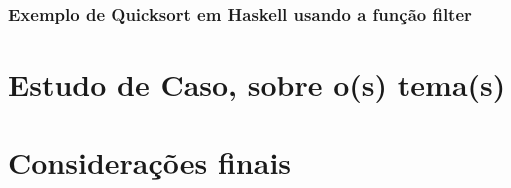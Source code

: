 \documentclass[
  article,			       %
  12pt,				         %
  oneside,			       %
  a4paper,			       %
  english,		       	 %
  brazil,			      	 %
  sumario=tradicional
]{abntex2}
\begin{document}
      

      \newpage

      \subsection{Exemplo de Quicksort em Haskell usando a função filter} 

      

    \newpage

    \chapter{Estudo de Caso, sobre o(s) tema(s)}

    \newpage

    \chapter{Considerações finais}

    \newpage

    \postextual
\end{document}

